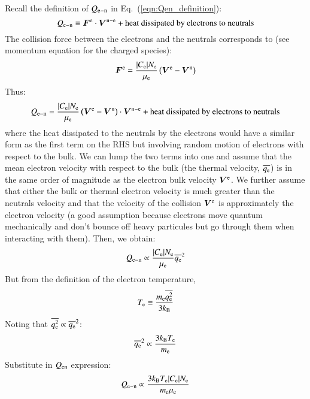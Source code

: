 \documentclass{warpdoc}
\renewcommand{\vec}[1]{\bm{#1}}
\begin{document}
Recall the definition of $Q_{\rm e-n}$ in Eq.\ (\ref{eqn:Qen_definition}):
%
\begin{equation}
Q_{\rm e-n} \equiv \vec{F}^{\rm e}\cdot  \vec{V}^{{\rm n}-{\rm e}} + \textrm{heat dissipated by electrons to neutrals}
\end{equation}
%
The collision force between the electrons and the neutrals corresponds to (see momentum equation for the charged species):
%
\begin{equation}
\vec{F}^{\rm e} = \frac{|C_{\rm e}|N_{\rm e}}{\mu_{\rm e}} \left(\vec{V}^{\rm e} - \vec{V}^{\rm n} \right)
\end{equation}
%
Thus:
%
\begin{equation}
Q_{\rm e-n} = \frac{|C_{\rm e}|N_{\rm e}}{\mu_{\rm e}} \left(\vec{V}^{\rm e} - \vec{V}^{\rm n} \right) \cdot  \vec{V}^{{\rm n}-{\rm e}} + \textrm{heat dissipated by electrons to neutrals}
\end{equation}
%
where the heat dissipated to the neutrals by the electrons would have a similar form as the first term on the RHS but involving random motion of electrons with respect to the bulk. We can lump the two terms into one and assume that the mean electron velocity with respect to the bulk (the thermal velocity, $\overline{q_{\rm e}}$) is in the same order of magnitude as the electron bulk velocity $\vec{V}^{\rm e}$. We further assume that either the bulk or thermal electron velocity is much greater than the neutrals velocity and that the velocity of the collision $\vec{V}^{\rm e}$ is approximately the electron velocity (a good assumption because electrons move quantum mechanically and don't bounce off heavy particules but go through them when interacting with them). Then, we obtain:
%
\begin{equation}
Q_{\rm e-n} \propto \frac{|C_{\rm e}|N_{\rm e}}{\mu_{\rm e}} \overline{q_{\rm e}}^2 
\end{equation}
%
But from the definition of the electron temperature,
%
\begin{equation}
T_{\rm e} \equiv \frac{m_{\rm e}\overline{q_{\rm e}^2}}{3 k_{\rm B} }
\end{equation}
%
Noting that $\overline{q_{\rm e}^2}\propto \overline{q_{\rm e}}^2$:
%
\begin{equation}
 \overline{q_{\rm e}}^2 \propto \frac{3 k_{\rm B} T_{\rm e}}{m_{\rm e}} 
\end{equation}
%
Substitute in $Q_{\rm en}$ expression:
%
\begin{equation}
Q_{\rm e-n} \propto \frac{3 k_{\rm B} T_{\rm e} |C_{\rm e}|N_{\rm e}}{m_{\rm e} \mu_{\rm e}}  
\end{equation}
\end{document}
